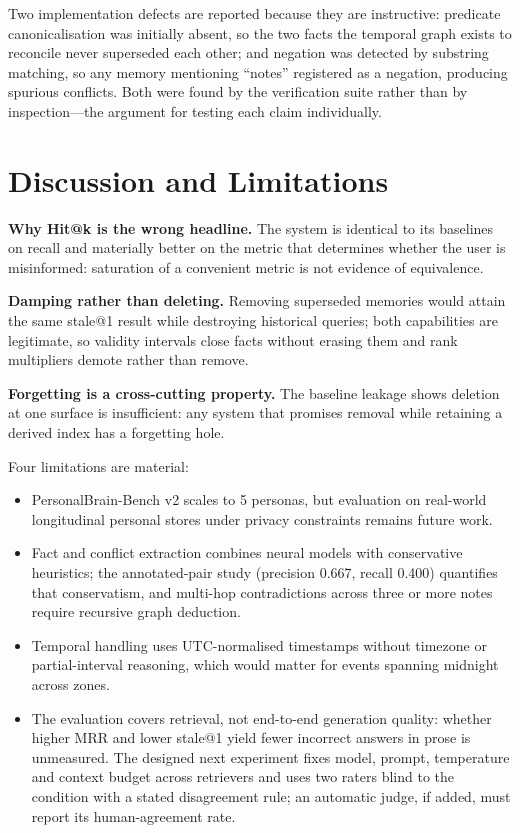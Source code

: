 \documentclass[conference]{IEEEtran}
\begin{document}
Two implementation defects are reported because they are instructive: predicate canonicalisation was initially absent, so the two facts the temporal graph exists to reconcile never superseded each other; and negation was detected by substring matching, so any memory mentioning ``notes'' registered as a negation, producing spurious conflicts. Both were found by the verification suite rather than by inspection---the argument for testing each claim individually.

\section{Discussion and Limitations}
\label{sec:discussion}

\textbf{Why Hit@k is the wrong headline.} The system is identical to its baselines on recall and materially better on the metric that determines whether the user is misinformed: saturation of a convenient metric is not evidence of equivalence.

\textbf{Damping rather than deleting.} Removing superseded memories would attain the same stale@1 result while destroying historical queries; both capabilities are legitimate, so validity intervals close facts without erasing them and rank multipliers demote rather than remove.

\textbf{Forgetting is a cross-cutting property.} The baseline leakage shows deletion at one surface is insufficient: any system that promises removal while retaining a derived index has a forgetting hole.

Four limitations are material:
\begin{itemize}
\item PersonalBrain-Bench v2 scales to 5 personas, but evaluation on real-world longitudinal personal stores under privacy constraints remains future work.
\item Fact and conflict extraction combines neural models with conservative heuristics; the annotated-pair study (precision 0.667, recall 0.400) quantifies that conservatism, and multi-hop contradictions across three or more notes require recursive graph deduction.
\item Temporal handling uses UTC-normalised timestamps without timezone or partial-interval reasoning, which would matter for events spanning midnight across zones.
\item The evaluation covers retrieval, not end-to-end generation quality: whether higher MRR and lower stale@1 yield fewer incorrect answers in prose is unmeasured. The designed next experiment fixes model, prompt, temperature and context budget across retrievers and uses two raters blind to the condition with a stated disagreement rule; an automatic judge, if added, must report its human-agreement rate.
\end{itemize}
\end{document}
